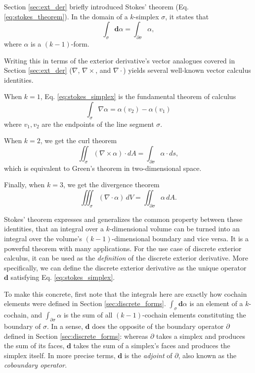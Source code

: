 \documentclass[utf8,english]{gradu3}
\begin{document}
Section \ref{sec:ext_der} briefly introduced Stokes' theorem
(Eq. \eqref{eq:stokes_theorem}).
In the domain of a $k$-simplex $\sigma$, it states that
\begin{equation}\label{eq:stokes_simplex}
  \int_{\sigma} \mathbf{d}\alpha = \int_{\partial\sigma} \alpha,
\end{equation}
where $\alpha$ is a $(k-1)$-form.

Writing this in terms of the exterior derivative's
vector analogues covered in Section \ref{sec:ext_der}
($\nabla$, $\nabla \times$, and $\nabla \cdot$)
yields several well-known vector calculus identities.

When $k = 1$, Eq. \eqref{eq:stokes_simplex}
is the fundamental theorem of calculus
\begin{equation}\label{eq:fund_theorem_calc}
  \int_{\sigma} \nabla \alpha = \alpha(v_2) - \alpha(v_1)
\end{equation}
where $v_1,v_2$ are the endpoints of the line segment $\sigma$.

When $k = 2$, we get the curl theorem
\begin{equation}\label{eq:curl_theorem}
  \iint_{\sigma} (\nabla \times \alpha) \cdot dA = \int_{\partial\sigma} \alpha \cdot ds,
\end{equation}
which is equivalent to Green's theorem in two-dimensional space.

Finally, when $k = 3$, we get the divergence theorem
\begin{equation}\label{eq:divergence_theorem}
  \iiint_{\sigma} (\nabla \cdot \alpha) \,dV = \iint_{\partial\sigma} \alpha \,dA.
\end{equation}

Stokes' theorem expresses and generalizes the common property between these identities,
that an integral over a $k$-dimensional volume
can be turned into an integral over the volume's
$(k-1)$-dimensional boundary and vice versa.
It is a powerful theorem with many applications.
For the use case of discrete exterior calculus,
it can be used as the \textit{definition} of
the discrete exterior derivative.
More specifically, we can define the discrete exterior derivative
as the unique operator $\mathbf{d}$ satisfying Eq. \eqref{eq:stokes_simplex}.

To make this concrete, first note that the integrals here
are exactly how cochain elements were defined in Section \ref{sec:discrete_forms}.
$\int_{\sigma} \mathbf{d}\alpha$ is an element of a $k$-cochain,
and $\int_{\partial\sigma} \alpha$ is the sum of all $(k-1)$-cochain elements
constituting the boundary of $\sigma$.
In a sense, $\mathbf{d}$ does the opposite of the boundary operator $\partial$
defined in Section \ref{sec:discrete_forms}:
whereas $\partial$ takes a simplex and produces the sum of its faces,
$\mathbf{d}$ takes the sum of a simplex's faces and produces the simplex itself.
In more precise terms, $\mathbf{d}$ is the \textit{adjoint} of $\partial$,
also known as the \textit{coboundary operator}.
\end{document}
